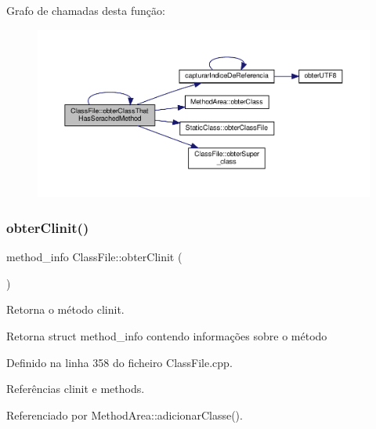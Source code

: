 Grafo de chamadas desta função\+:
\nopagebreak
\begin{figure}[H]
\begin{center}
\leavevmode
\includegraphics[width=350pt]{classClassFile_a4d0ac62c4d6218ddada33f715ebaf633_cgraph}
\end{center}
\end{figure}
\mbox{\label{classClassFile_a1141f5a8c856d5f3931f0b518e219f79}} 
\subsubsection{\texorpdfstring{obter\+Clinit()}{obterClinit()}}
{\footnotesize\ttfamily method\+\_\+info Class\+File\+::obter\+Clinit (\begin{DoxyParamCaption}{ }\end{DoxyParamCaption})}



Retorna o método clinit. 

\begin{DoxyReturn}{Retorna}
struct method\+\_\+info contendo informações sobre o método 
\end{DoxyReturn}


Definido na linha 358 do ficheiro Class\+File.\+cpp.



Referências clinit e methods.



Referenciado por Method\+Area\+::adicionar\+Classe().

\mbox{\label{classClassFile_ab70fe581c4b7a1824adf490c3a53bcc7}} 
